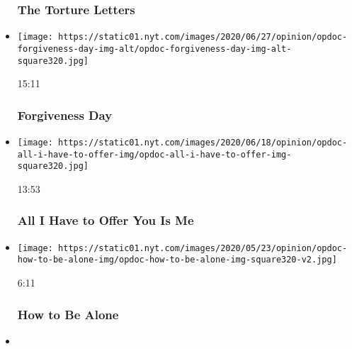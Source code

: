 \begin{itemize}
{  \subsubsection{The Torture Letters}\label{the-torture-letters}}
\item
  \href{https://www.nytimes.com/video/opinion/100000007172575/forgiveness-day.html?action=click\&module=video-series-bar\&region=header\&pgtype=Article\&playlistId=video/op-docs}{}

  \texttt{[image: https://static01.nyt.com/images/2020/06/27/opinion/opdoc-forgiveness-day-img-alt/opdoc-forgiveness-day-img-alt-square320.jpg]}

  15:11

  \hypertarget{forgiveness-day}{%
  \subsubsection{Forgiveness Day}\label{forgiveness-day}}
\item
  \href{https://www.nytimes.com/video/opinion/100000007133685/all-i-have-to-offer-you-is-me.html?action=click\&module=video-series-bar\&region=header\&pgtype=Article\&playlistId=video/op-docs}{}

  \texttt{[image: https://static01.nyt.com/images/2020/06/18/opinion/opdoc-all-i-have-to-offer-img/opdoc-all-i-have-to-offer-img-square320.jpg]}

  13:53

  \hypertarget{all-i-have-to-offer-you-is-me}{%
  \subsubsection{All I Have to Offer You Is
  Me}\label{all-i-have-to-offer-you-is-me}}
\item
  \href{https://www.nytimes.com/video/opinion/100000007139379/how-to-be-alone.html?action=click\&module=video-series-bar\&region=header\&pgtype=Article\&playlistId=video/op-docs}{}

  \texttt{[image: https://static01.nyt.com/images/2020/05/23/opinion/opdoc-how-to-be-alone-img/opdoc-how-to-be-alone-img-square320-v2.jpg]}

  6:11

  \hypertarget{how-to-be-alone}{%
  \subsubsection{How to Be Alone}\label{how-to-be-alone}}
\item
  \href{https://www.nytimes.com/video/opinion/100000006590759/container-greece-migrants.html?action=click\&module=video-series-bar\&region=header\&pgtype=Article\&playlistId=video/op-docs}{}


\end{itemize}
